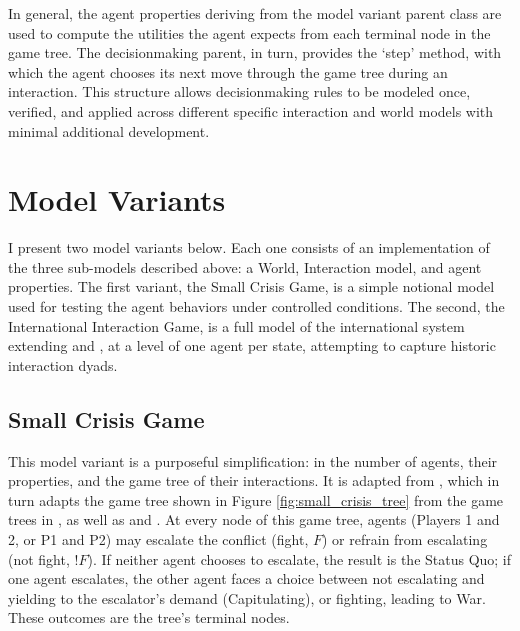 In general, the agent properties deriving from the model variant parent class are used to compute the utilities the agent expects from each terminal node in the game tree. The decisionmaking parent, in turn, provides the `step' method, with which the agent chooses its next move through the game tree during an interaction. This structure allows decisionmaking rules to be modeled once, verified, and applied across different specific interaction and world models with minimal additional development. 

\section{Model Variants}

I present two model variants below. Each one consists of an implementation of the three sub-models described above: a World, Interaction model, and agent properties. The first variant, the Small Crisis Game, is a simple notional model used for testing the agent behaviors under controlled conditions. The second, the International Interaction Game, is a full model of the international system extending \citet{bdm_1992} and \citet{bennett_2000b}, at a level of one agent per state, attempting to capture historic interaction dyads.

\subsection{Small Crisis Game} \label{small_crisis}

This model variant is a purposeful simplification: in the number of agents, their properties, and the game tree of their interactions. It is adapted from \citet{signorino_1999}, which in turn adapts the game tree shown in Figure \ref{fig:small_crisis_tree} from the game trees in \citet{bdm_1992}, as well as \citet{kim_1995} and \citet{fearon_1995}. At every node of this game tree, agents (Players 1 and 2, or P1 and P2) may escalate the conflict (fight, $F$) or refrain from escalating (not fight, $!F$). If neither agent chooses to escalate, the result is the Status Quo; if one agent escalates, the other agent faces a choice between not escalating and yielding to the escalator's demand (Capitulating), or fighting, leading to War. These outcomes are the tree's terminal nodes.

